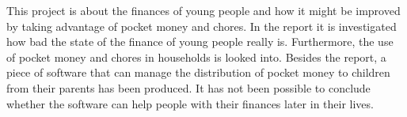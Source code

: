 This project is about the finances of young people and how it might be improved by taking advantage of pocket money and chores. In the report it is investigated how bad the state of the finance of young people really is. Furthermore, the use of pocket money and chores in households is looked into. Besides the report, a piece of software that can manage the distribution of pocket money to children from their parents has been produced. It has not been possible to conclude whether the software can help people with their finances later in their lives. 
